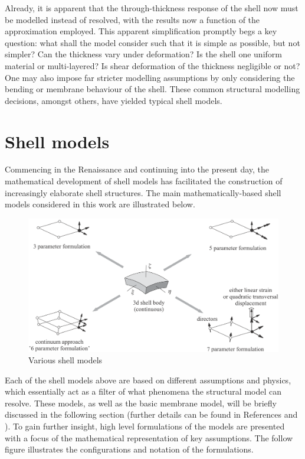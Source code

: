 Already, it is apparent that the through-thickness response of the shell now must be modelled instead of resolved, with the results now a function of the approximation employed. This apparent simplification promptly begs a key question: what shall the model consider such that it is simple as possible, but not simpler? Can the thickness vary under deformation? Is the shell one uniform material or multi-layered? Is shear deformation of the thickness negligible or not? One may also impose far stricter modelling assumptions by only considering the bending or membrane behaviour of the shell. These common structural modelling decisions, amongst others, have yielded typical shell models.

\section{Shell models}

Commencing in the Renaissance and continuing into the present day, the mathematical development of shell models has facilitated the construction of increasingly elaborate shell structures. The main mathematically-based shell models considered in this work are illustrated below.

\begin{figure}[H]
	\centering
	\def\svgwidth{\columnwidth}
	\includegraphics[width=12cm]{images/shellModels.png}
	\caption{Various shell models \cite{Wall2000}}
	\label{shellModels}
\end{figure}

Each of the shell models above are based on different assumptions and physics, which essentially act as a filter of what phenomena the structural model can resolve. These models, as well as the basic membrane model, will be briefly discussed in the following section (further details can be found in References \cite{BischLitBook04} \cite{RammLitBook04} and \cite{Echter13}). To gain further insight, high level formulations of the models are presented with a focus of the mathematical representation of key assumptions.  The follow figure illustrates the configurations and notation of the formulations. 

